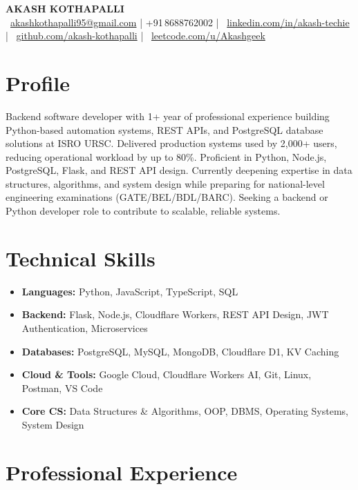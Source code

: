 \documentclass[a4paper,10pt]{article}
\newcommand{\iconbadge}[1]{%
  \tikz[baseline=-0.55ex]{\node[circle,fill=myblue,text=white,font=\bfseries\fontsize{5}{5}\selectfont,inner sep=1.3pt,minimum size=10pt]{#1};}%
}
\begin{document}
\begin{center}
  {\LARGE \textbf{AKASH KOTHAPALLI}}\\[5pt]
  {\small
    \iconbadge{@}~\href{mailto:akashkothapalli95@gmail.com}{akashkothapalli95@gmail.com}
    \enspace\textcolor{myblue}{|}\enspace
    +91\,8688762002
    \enspace\textcolor{myblue}{|}\enspace
    \iconbadge{in}~\href{https://www.linkedin.com/in/akash-techie}{linkedin.com/in/akash-techie}
    \enspace\textcolor{myblue}{|}\enspace
    \iconbadge{gh}~\href{https://github.com/akash-kothapalli}{github.com/akash-kothapalli}
    \enspace\textcolor{myblue}{|}\enspace
    \iconbadge{lc}~\href{https://leetcode.com/u/Akashgeek}{leetcode.com/u/Akashgeek}
  }
\end{center}

\section*{Profile}
Backend software developer with 1+ year of professional experience building Python-based automation systems, REST APIs, and PostgreSQL database solutions at ISRO URSC. Delivered production systems used by 2,000+ users, reducing operational workload by up to 80\%. Proficient in Python, Node.js, PostgreSQL, Flask, and REST API design. Currently deepening expertise in data structures, algorithms, and system design while preparing for national-level engineering examinations (GATE/BEL/BDL/BARC). Seeking a backend or Python developer role to contribute to scalable, reliable systems.

\section*{Technical Skills}
\begin{itemize}
\item \textbf{Languages:} Python, JavaScript, TypeScript, SQL
\item \textbf{Backend:} Flask, Node.js, Cloudflare Workers, REST API Design, JWT Authentication, Microservices
\item \textbf{Databases:} PostgreSQL, MySQL, MongoDB, Cloudflare D1, KV Caching
\item \textbf{Cloud \& Tools:} Google Cloud, Cloudflare Workers AI, Git, Linux, Postman, VS Code
\item \textbf{Core CS:} Data Structures \& Algorithms, OOP, DBMS, Operating Systems, System Design
\end{itemize}

\section*{Professional Experience}
\end{document}

